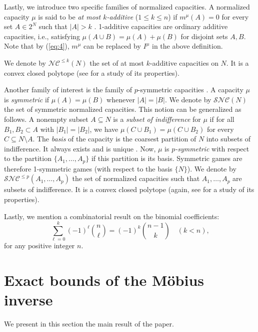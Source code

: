 \documentclass[12pt,a4paper]{article}
\theoremstyle{definition}
\theoremstyle{remark}
\def \NC {\mathscr{NC}}
\def \SNC {\mathscr{SNC}}
\begin{document}
\medskip

Lastly, we introduce two specific families of normalized capacities. A
normalized capacity $\mu$ is said to be \textit{at most $k$-additive}
($1\leqslant k\leqslant n$) if $m^\mu(A)=0$ for every set $A\in 2^N$ such that
$|A|>k$ \cite{gra96f}. 1-additive capacities are ordinary additive capacities,
i.e., satisfying $\mu(A\cup B)=\mu(A)+\mu(B)$ for disjoint sets $A,B$. Note that
by (\ref{eq:4}), $m^\mu$ can be replaced by $I^\mu$ in the above definition.

We denote by $\NC^{\leqslant k}(N)$ the set of at most $k$-additive capacities
on $N$. It is a convex closed polytope (see \cite{micogi06} for a study of its properties).

Another family of interest is the family of $p$-symmetric capacities
\cite{migrgi02}. A capacity $\mu$ is \textit{symmetric} if $\mu(A)=\mu(B)$
whenever $|A|=|B|$.  We denote by $\SNC(N)$ the set of symmetric normalized
capacities. This notion can be generalized as follows. A nonempty subset
$A\subseteq N$ is a \textit{subset of indifference} for $\mu$ if for all
$B_1,B_2\subset A$ with $|B_1|=|B_2|$, we have $\mu(C\cup B_1)= \mu(C\cup B_2)$
for every $C\subseteq N\setminus A$. The \textit{basis} of the capacity is the
coarsest partition of $N$ into subsets of indifference. It always exists and is
unique \cite{migr03a}. Now, $\mu$ is \textit{$p$-symmetric} with respect to the
partition $\{ A_1,\ldots, A_p\} $ if this partition is its basis. Symmetric
games are therefore 1-symmetric games (with respect to the basis $\{ N\} $). We
denote by $\SNC^{\leqslant p}(A_1,\ldots, A_p)$ the set of normalized
capacities such that $A_1,\ldots, A_p$ are subsets of indifference. It is a
convex closed polytope (again, see \cite{micogi06} for a study of its properties).

Lastly, we mention a combinatorial result on the binomial coefficients:
\begin{equation}\label{eq:1.comb2}
\sum_{\ell=0}^k(-1)^\ell\binom{n}{\ell} = (-1)^k\binom{n-1}{k} \quad (k<n),
\end{equation}
for any positive integer $n$.

\section{Exact bounds of the M\"obius inverse}
We present in this section the main result of the paper.
\end{document}
